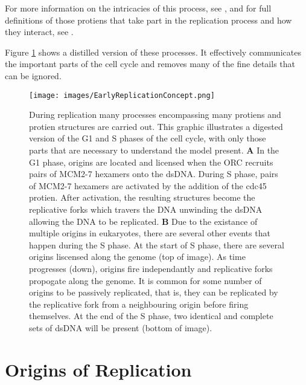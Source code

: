 		For more information on the intricacies of this process, see \cite{OriginsReview}, and for full definitions of those protiens that take part in the replication process and how they interact, see \cite{PurifiedProteins}.
		
	Figure \ref{EarlyReplicationConcept} shows a distilled version of these processes. It effectively communicates the important parts of the cell cycle and removes many of the fine details that can be ignored.
	
	\begin{figure}[tbh]
		\begin{center}
			\texttt{[image: images/EarlyReplicationConcept.png]}
		\end{center}
			\caption[Events During Replication]{\label{EarlyReplicationConcept} During replication many processes encompassing many protiens and protien structures are carried out.
				This graphic illustrates a digested version of the G1 and S phases of the cell cycle, with only those parts that are necessary to understand the model present.
				\textbf{A} In the G1 phase, origins are located and licensed when the ORC recruits pairs of MCM2-7 hexamers onto the dsDNA.
					During S phase, pairs of MCM2-7 hexamers are activated by the addition of the cdc45 protien.
					After activation, the resulting structures become the replicative forks which travers the DNA unwinding the dsDNA allowing the DNA to be replicated.
				\textbf{B} Due to the existance of multiple origins in eukaryotes, there are several other events that happen during the S phase.
					At the start of S phase, there are several origins liscensed along the genome (top of image).
					As time progresses (down), origins fire independantly and replicative forks propogate along the genome.
					It is common for some number of origins to be passively replicated, that is, they can be replicated by the replicative fork from a neighbouring origin before firing themselves.
					At the end of the S phase, two identical and complete sets of dsDNA will be present (bottom of image).}
	\end{figure}
	
	
	\section{Origins of Replication}
	
